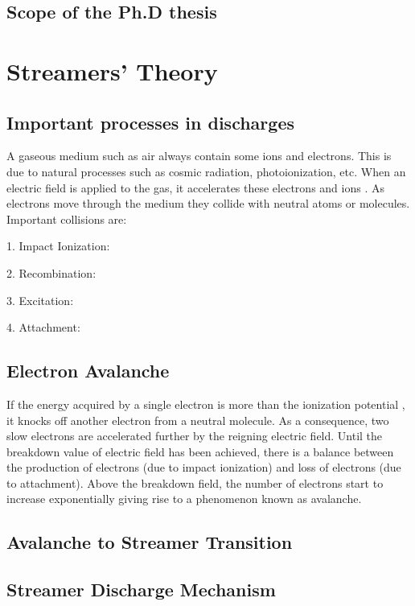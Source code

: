 \section{Scope of the Ph.D thesis}




\chapter{Streamers' Theory}

\section{Important processes in discharges}
A gaseous medium such as air always contain some ions and electrons. This is due to natural processes such as cosmic radiation, photoionization, etc. When an electric field is applied to the gas, it accelerates these electrons and ions . As electrons move through the medium they collide with neutral atoms or molecules. Important collisions are:

1. Impact Ionization:

2. Recombination:

3. Excitation:

4. Attachment:



\section{Electron Avalanche}

If the energy acquired by a single electron is more than the ionization potential , it knocks off another electron from a neutral molecule. As a consequence, two slow electrons are accelerated further by the reigning electric field. Until the breakdown value of electric field has been achieved, there is a balance between the production of electrons (due to impact ionization) and loss of electrons (due to attachment). Above the breakdown field, the number of electrons start to increase exponentially giving rise to a phenomenon known as avalanche.

\section{Avalanche to Streamer Transition}


\section{Streamer Discharge Mechanism}

